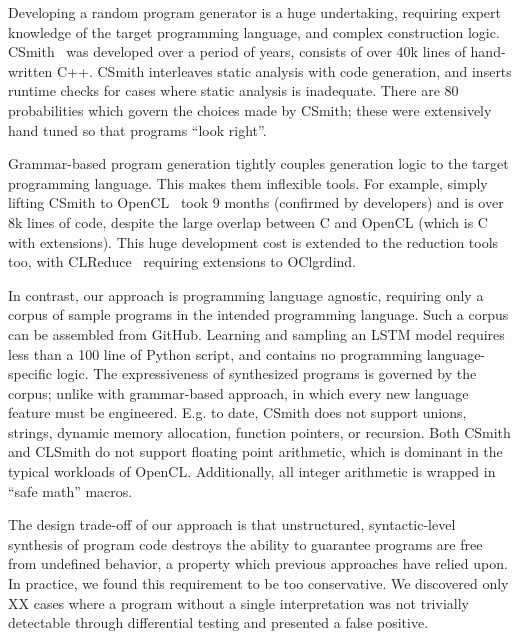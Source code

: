 Developing a random program generator is a huge undertaking, requiring expert knowledge of the target programming language, and complex construction logic. CSmith~\cite{Yang2011} was developed over a period of years, consists of over 40k lines of hand-written C++. CSmith interleaves static analysis with code generation, and inserts runtime checks for cases where static analysis is inadequate. There are 80 probabilities which govern the choices made by CSmith; these were extensively hand tuned so that programs ``look right''.

Grammar-based program generation tightly couples generation logic to the target programming language. This makes them inflexible tools. For example, simply lifting CSmith to OpenCL~\cite{Lidbury2015a} took 9 months (confirmed by developers) and is over 8k lines of code, despite the large overlap between C and OpenCL (which is C with extensions). This huge development cost is extended to the reduction tools too, with CLReduce~\cite{Pflanzer2016} requiring extensions to OClgrdind.

In contrast, our approach is programming language agnostic, requiring only a corpus of sample programs in the intended programming language. Such a corpus can be assembled from GitHub. Learning and sampling an LSTM model requires less than a 100 line of Python script, and contains no programming language-specific logic. The expressiveness of synthesized programs is governed by the corpus; unlike with grammar-based approach, in which every new language feature must be engineered. E.g. to date, CSmith does not support unions, strings, dynamic memory allocation, function pointers, or recursion. Both CSmith and CLSmith do not support floating point arithmetic, which is dominant in the typical workloads of OpenCL. Additionally, all integer arithmetic is wrapped in ``safe math'' macros.

The design trade-off of our approach is that unstructured, syntactic-level synthesis of program code destroys the ability to guarantee programs are free from undefined behavior, a property which previous approaches have relied upon. In practice, we found this requirement to be too conservative. We discovered only XX cases where a program without a single interpretation was not trivially detectable through differential testing and presented a false positive.

